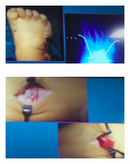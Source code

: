 \begin{itemize}
\begin{itemize}
\begin{figure}[!ht]
\centering
\includegraphics[width=0.4\textwidth]{016/image51.png}
\end{figure}

\begin{figure}[!ht]
\centering
\includegraphics[width=0.4\textwidth]{016/image52.png}
\end{figure}

\end{itemize}
\end{itemize}

